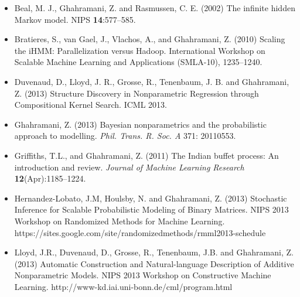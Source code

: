 {\small
\begin{itemize}


\item Beal, M. J., Ghahramani, Z. and Rasmussen, C. E. (2002) The
 infinite hidden Markov model. NIPS {\bf 14}:577--585. 

 \item Bratieres, S., van Gael, J., Vlachos, A., and Ghahramani,
   Z. (2010) Scaling the iHMM: Parallelization versus
  Hadoop. International Workshop on Scalable Machine Learning and
  Applications (SMLA-10), 1235--1240.

\item Duvenaud, D., Lloyd, J. R., Grosse, R., Tenenbaum, J. B. and
Ghahramani, Z. (2013) Structure Discovery in Nonparametric
Regression through Compositional Kernel Search. ICML 2013.


\item Ghahramani, Z. (2013) Bayesian nonparametrics and
the probabilistic approach to modelling. {\em
  Phil. Trans. R. Soc. A} 371: 20110553.


\item Griffiths, T.L., and Ghahramani, Z. (2011) The Indian buffet
  process: An introduction and review. {\em Journal of Machine
    Learning Research} {\bf 12}(Apr):1185--1224. 

\item Hernandez-Lobato, J.M, Houlsby, N. and Ghahramani, Z. (2013)
Stochastic Inference for Scalable Probabilistic Modeling of Binary
Matrices. NIPS 2013 Workshop on Randomized Methods for Machine
Learning. 
https://sites.google.com/site/randomizedmethods/rmml2013-schedule

\item Lloyd, J.R., Duvenaud, D., Grosse, R., Tenenbaum, J.B. and
Ghahramani, Z. (2013) Automatic Construction and Natural-language
Description of Additive Nonparametric Models. NIPS 2013 Workshop on
Constructive Machine Learning. 
http://www-kd.iai.uni-bonn.de/cml/program.html

%


\end{itemize}}
